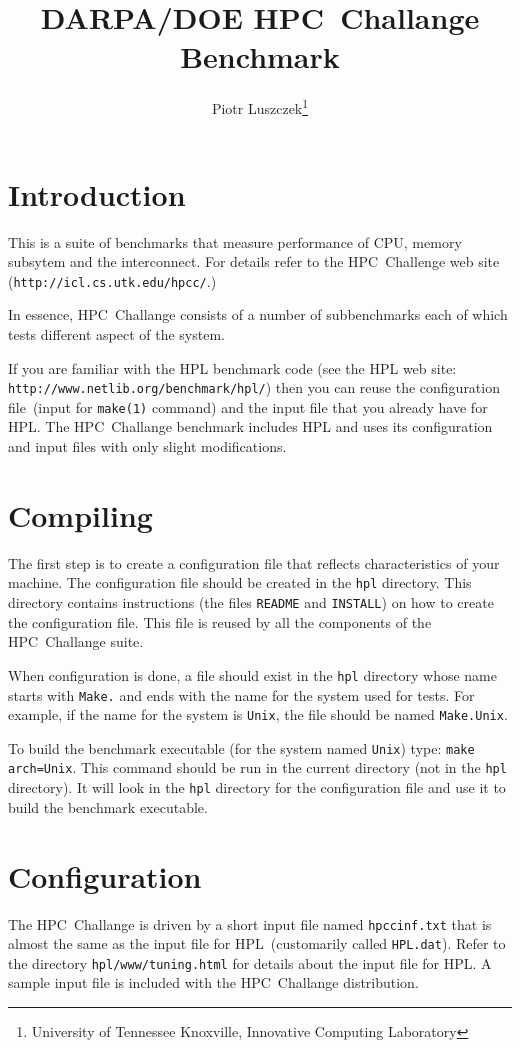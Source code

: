 \documentclass[twocolumn]{article}
\begin{document}
\title{DARPA/DOE HPC~Challange Benchmark} \author{Piotr
Luszczek\footnote{University of Tennessee Knoxville, Innovative
Computing Laboratory}} \maketitle

\section{Introduction}
This is a suite of benchmarks that measure performance of CPU, memory
subsytem and the interconnect. For details refer to the
HPC~Challenge web site (\texttt{http://icl.cs.utk.edu/hpcc/}.)

In essence, HPC~Challange consists of a number of subbenchmarks each
of which tests different aspect of the system.

If you are familiar with the HPL benchmark code (see the HPL web site:
\texttt{http://www.netlib.org/benchmark/hpl/}) then you can reuse the
configuration file~(input for \texttt{make(1)} command) and the input
file that you already have for HPL. The HPC~Challange benchmark
includes HPL and uses its configuration and input files with only
slight modifications.

\section{Compiling}
The first step is to create a configuration file that reflects
characteristics of your machine. The configuration file should be
created in the \texttt{hpl} directory. This directory contains
instructions (the files \texttt{README} and \texttt{INSTALL}) on how
to create the configuration file. This file is reused by all the
components of the HPC~Challange suite.

When configuration is done, a file should exist in the \texttt{hpl}
directory whose name starts with \texttt{Make.} and ends with the name
for the system used for tests. For example, if the name for the system
is \texttt{Unix}, the file should be named \texttt{Make.Unix}.

To build the benchmark executable (for the system named \texttt{Unix})
type: \texttt{make arch=Unix}.  This command should be run in the
current directory (not in the \texttt{hpl} directory). It will look in
the \texttt{hpl} directory for the configuration file and use it to
build the benchmark executable.

\section{Configuration}
The HPC~Challange is driven by a short input file named
\texttt{hpccinf.txt} that is almost the same as the input file for
HPL~(customarily called \texttt{HPL.dat}). Refer to the directory
\texttt{hpl/www/tuning.html} for details about the input file for
HPL. A sample input file is included with the HPC~Challange
distribution.
\end{document}
